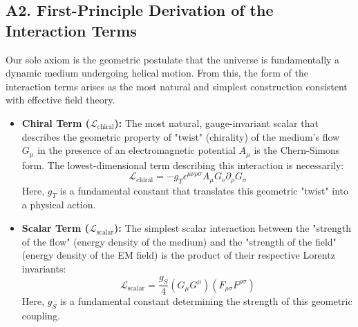 \documentclass[aps,prl,twocolumn,superscriptaddress,longbibliography,floatfix]{revtex4-2}
\begin{document}
\subsection{A2. First-Principle Derivation of the Interaction Terms}
Our sole axiom is the geometric postulate that the universe is fundamentally a dynamic medium undergoing helical motion. From this, the form of the interaction terms arises as the most natural and simplest construction consistent with effective field theory.
\begin{itemize}
    \item \textbf{Chiral Term ($\mathcal{L}_{\text{chiral}}$):} The most natural, gauge-invariant scalar that describes the geometric property of "twist" (chirality) of the medium's flow $G_\mu$ in the presence of an electromagnetic potential $A_\mu$ is the Chern-Simons form. The lowest-dimensional term describing this interaction is necessarily:
    \begin{equation}
        \mathcal{L}_{\text{chiral}} = -g_T \epsilon^{\mu\nu\rho\sigma} A_\mu G_\nu \partial_\rho G_\sigma
    \end{equation}
    Here, $g_T$ is a fundamental constant that translates this geometric "twist" into a physical action.
    \item \textbf{Scalar Term ($\mathcal{L}_{\text{scalar}}$):} The simplest scalar interaction between the "strength of the flow" (energy density of the medium) and the "strength of the field" (energy density of the EM field) is the product of their respective Lorentz invariants:
    \begin{equation}
        \mathcal{L}_{\text{scalar}} = \frac{g_S}{4} (G_\mu G^\mu)(F_{\rho\sigma}F^{\rho\sigma})
    \end{equation}
    Here, $g_S$ is a fundamental constant determining the strength of this geometric coupling.
\end{itemize}
\end{document}
